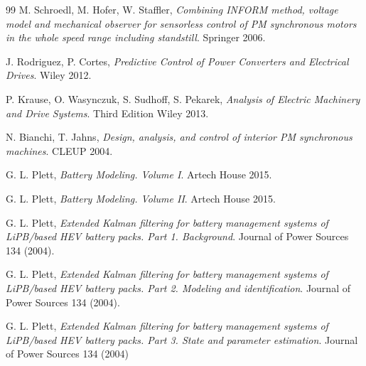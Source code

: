 \documentclass[11pt,a4paper,oneside]{book}
\numberwithin{equation}{section}
\theoremstyle{it}
\theoremstyle{definition}
\begin{document}
\clearpage
\begin{thebibliography}{99}
	M. Schroedl, M. Hofer, W. Staffler, \emph{Combining INFORM method, voltage model and mechanical observer for sensorless control of PM synchronous motors in the whole speed range including standstill}. Springer 2006.
	
	J. Rodriguez, P. Cortes, \emph{Predictive Control of Power Converters and Electrical Drives}. Wiley 2012.
	
	P. Krause, O. Wasynczuk, S. Sudhoff, S. Pekarek, \emph{Analysis of Electric Machinery and Drive Systems}. Third Edition Wiley 2013.
	
	N. Bianchi, T. Jahns,  \emph{Design, analysis, and control of interior PM synchronous machines}. CLEUP 2004.
	
	G. L. Plett,  \emph{Battery Modeling. Volume I}. Artech House 2015.
	
	G. L. Plett,  \emph{Battery Modeling. Volume II}. Artech House 2015.
	
	G. L. Plett,  \emph{Extended Kalman filtering for battery management systems of LiPB/based HEV battery packs. Part 1. Background}. Journal of Power Sources 134 (2004).
	
	G. L. Plett,  \emph{Extended Kalman filtering for battery management systems of LiPB/based HEV battery packs. Part 2. Modeling and identification}. Journal of Power Sources 134 (2004).	
	
	G. L. Plett,  \emph{Extended Kalman filtering for battery management systems of LiPB/based HEV battery packs. Part 3. State and parameter estimation}. Journal of Power Sources 134 (2004)	
	
\end{thebibliography}
\end{document}
